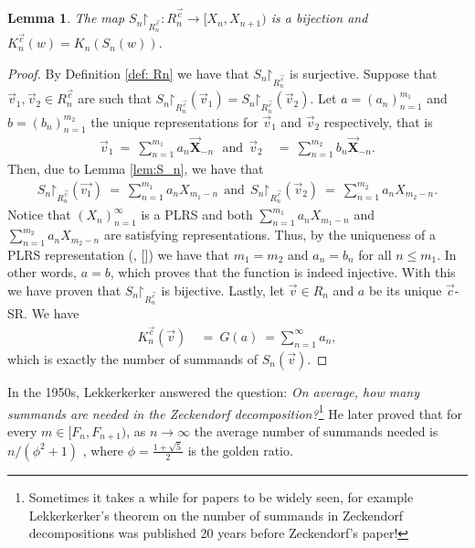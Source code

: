 \documentclass[]{interact}
\renewcommand{\restriction}{\mathord{\upharpoonright}}
\let\emph\relax %
\newcommand{\vtr}[1]{\vec{\mathbf{#1}}}
\theoremstyle{plain}
\numberwithin{equation}{section} %
\newtheorem{lemma}[thm]{Lemma}
\numberwithin{table}{section} %
\numberwithin{figure}{section}
\newcommand{\X}{\vtr{X}}
\begin{document}
\begin{lemma} \label{lem:Sn&Kn}
    The map ${S_n\restriction_{R_n^{\vec{c}}}}:R_n^{\vec{c}} \rightarrow [X_n, X_{n+1})$ is a bijection and $K_n^{\vec{c}}(w) = K_n(S_n(w))$.
\end{lemma}
\begin{proof}
    By Definition \textcolor{blue}{\ref{def: Rn}} we have that $S_n \restriction_{R_n^{\vec{c}}}$ is surjective.
    Suppose that $\vec{v}_1, \vec{v}_2 \in R_n^{\vec{c}}$ are such that $S_n\restriction_{R_n^{\vec{c}}} (\vec{v}_1) = S_n \restriction_{R_n^{\vec{c}}} (\vec{v}_2)$. Let $a=(a_n)_{n=1}^{m_1}$ and $b=(b_n)_{n=1}^{m_2}$ the unique representations for $\vec{v}_1$ and $\vec{v}_2$ respectively, that is
    \begin{align*}
        \vec{v}_1 \ = \ \sum_{n=1}^{m_1} a_n \X_{-n} \ \  \ \text{and}\ \  \vec{v}_2 \ &= \ \sum_{n=1}^{m_2} b_n \X_{-n}.
    \end{align*}
    Then, due to Lemma \textcolor{blue}{\ref{lem:S_n}}, we have that
    \begin{align*}
     S_n \restriction_{R_n^{\vec{c}}} (\vec{v_1})\ = \ \sum_{n=1}^{m_1}a_n X_{m_1 - n} \  \ \text{and}\ \ S_n \restriction_{R_n^{\vec{c}}} (\vec{v}_2) \  = \ \sum_{n=1}^{m_2} a_n X_{m_2 -n}.
    \end{align*}
     Notice that $(X_n)_{n=1}^\infty$ is a PLRS and both $\sum_{n=1}^{m_1}a_n X_{m_1 - n}$ and $\sum_{n=1}^{m_2}a_n X_{m_2 - n}$ are satisfying representations. Thus, by the uniqueness of a PLRS representation \rm{(}\textcolor{blue}{\cite{MW12}}, [\emph{Theorem 1.1}]\rm{)} we have that $m_1 = m_2$ and $a_n = b_n$ for all $n\leq m_1$. In other words, $a = b$, which proves that the function is indeed injective. With this we have proven that $S_n \restriction_{R_n^{\vec{c}}}$ is bijective. Lastly, let $\vec{v}\in R_n$ and $a$ be its unique $\vec{c}$-SR. We have
    \begin{align*}
        K_n^{\vec{c}}(\vec{v}) \ &=\ G(a) \ = \sum_{n=1}^{\infty} a_n,
    \end{align*}
    which is exactly the number of summands of $S_n(\vec{v})$.
    
\end{proof}
In the 1950s, Lekkerkerker \textcolor{blue}{\cite{Lekkerkerker51}} answered the question: \textit{On average, how many summands are needed in the Zeckendorf decomposition?}\footnote{Sometimes it takes a while for papers to be widely seen, for example Lekkerkerker's theorem on the number of summands in Zeckendorf decompositions was published 20 years before Zeckendorf's paper! } He later proved that for every $m\in[F_n, F_{n+1})$, as $ n \rightarrow \infty $ the average number of summands needed is $ n/(\phi^2 + 1) $ , where $ \phi = \frac{1 + \sqrt{5}}{2}$ is the golden ratio.
\end{document}
